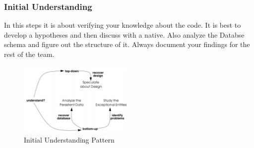 \subsubsection{Initial Understanding}
In this steps it is about verifying your knowledge about the code. It is best to develop a hypotheses and then discuss with a native. Also analyze the Databse schema and figure out the structure of it. Always document your findings for the rest of the team.
\begin{figure}[H]
\centering
\includegraphics[width=0.5\textwidth]{figures/InitialUnderstanding.PNG}
\caption{Initial Understanding Pattern}
\end{figure}































